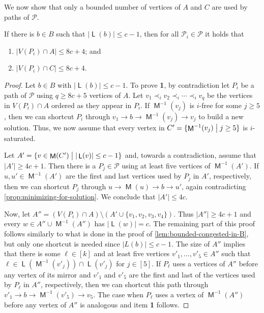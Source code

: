 \documentclass[a4paper,UKenglish,cleveref, autoref, thm-restate]{lipics-v2021}
\newcommand{\lipItem}[1]{\textcolor{lipicsGray}{\sffamily\bfseries\upshape\mathversion{bold}#1}}
\DeclareMathOperator{\List}{\mathsf L}
\DeclareMathOperator{\Mat}{\mathsf M}
\renewcommand{\mid}{\bigm|}
\begin{document}
We now show that only a bounded number of vertices of $A$ and $C$ are used by paths of
$\mathcal{P}$.
\begin{lemma}\label{lem:bounded-intersection-in-A-C}
  If there is $b \in B$ such that $|\List(b)| \leq c-1$, then for all $\mathcal{P}_i \in
  \mathcal{P}$ it holds that
  \begin{enumerate}
    \item $|V(P_i) \cap A| \leq 8c+4$; and
    \item $|V(P_i) \cap C| \leq 8c+4$.
  \end{enumerate}
\end{lemma}
\begin{proof}
  Let $b \in B$ with $|\List(b)| \leq c-1$. To prove \lipItem{1}, by contradiction let
  $P_i$ be a path of $\mathcal{P}$ using $q \geq 8c + 5$ vertices of $A$.
  Let $v_1 \prec_i v_2 \prec_i \cdots \prec_i v_q$ be the vertices in $V(P_i) \cap A$
  ordered as they appear in $P_i$.
  If $\Mat^{-1}(v_j)$ is $i$-free for some $j \geq 5$, then we can shortcut $P_i$ through
  $v_1 \to b \to \Mat^{-1}(v_j) \to v_j$ to build a new solution.
  Thus, we now assume that every vertex in $C' = \{\Mat^{-1}(v_j) \mid j \geq 5\}$ is $i$-saturated.

  Let $A' = \{v \in \Mat(C') \mid |\List(v)| \leq c-1\}$ and, towards a contradiction, assume that $|A'| \geq 4c+1$.
  Then there is a $P_j \in \mathcal{P}$ using at least five vertices of $\Mat^{-1}(A')$.
  If $u,u' \in \Mat^{-1}(A')$ are the first and last vertices used by $P_j$ in $A'$, respectively, then we can
  shortcut $P_j$ through $u \to \Mat(u) \to b \to u'$, again contradicting
  \autoref{prop:minimizing-for-solution}.
  We conclude that $|A'| \leq 4c$.

  Now, let $A'' = (V(P_i) \cap A) \setminus (A' \cup \{v_1, v_2, v_3, v_4\})$.
  Thus $|A''| \geq 4c+1$ and every $w \in A'' \cup \Mat^{-1}(A'')$ has $|\List(w)| = c$.
  The remaining part of this proof follows similarly to what is done in the proof of
  \autoref{lem:bounded-congested-in-B}, but only one shortcut is needed since $|L(b)| \leq c-1$.
  The size of $A''$ implies that there is some $\ell \in [k]$ and at least five vertices
  $v'_1, \ldots, v'_5 \in A''$ such that $\ell \in \List(\Mat^{-1}(v'_j)) \cap
  \List(v'_j)$ for $j \in [5]$.
  If $P_\ell$ uses a vertices of $A''$ before any vertex of its mirror and
  $v'_1$ and $v'_5$ are the first and last of the vertices used by $P_\ell$ in $A''$,
  respectively, then we can shortcut this path through $v'_1 \to b \to \Mat^{-1}(v'_5) \to v_5$.
  The case when $P_\ell$ uses a vertex of $\Mat^{-1}(A'')$ before any vertex of $A''$ is
  analogous and item \lipItem{1} follows.


\end{proof}
\end{document}
